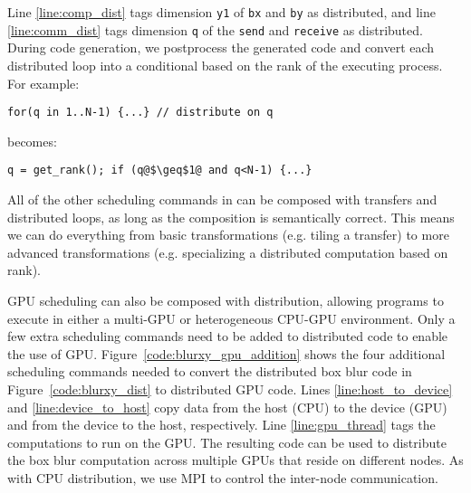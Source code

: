 Line \ref{line:comp_dist} tags dimension \lstinline{y1} of \lstinline{bx} and \lstinline{by} as distributed, and line \ref{line:comm_dist} tags dimension \lstinline{q} of the \lstinline{send} and \lstinline{receive} as distributed. During code generation, we postprocess the generated code and convert each distributed loop into a conditional based on the rank of the executing process. For example: 
\begin{lstlisting}[numbers=none]
for(q in 1..N-1) {...} // distribute on q
\end{lstlisting}
becomes:
\begin{lstlisting}[escapechar=@,numbers=none]
q = get_rank(); if (q@$\geq$1@ and q<N-1) {...}
\end{lstlisting}

All of the other scheduling commands in \framework{} can be composed with transfers and distributed loops, as long as the composition is semantically correct.  This means we can do everything from basic transformations (e.g. tiling a transfer) to more advanced transformations (e.g. specializing a distributed computation based on rank).

GPU scheduling can also be composed with distribution, allowing programs to execute in either a multi-GPU or heterogeneous CPU-GPU environment. Only a few extra scheduling commands need to be added to distributed \framework{} code to enable the use of GPU. Figure~\ref{code:blurxy_gpu_addition} shows the four additional scheduling commands needed to convert the distributed box blur code in Figure~\ref{code:blurxy_dist} to distributed GPU code. Lines \ref{line:host_to_device} and \ref{line:device_to_host} copy data from the host (CPU) to the device (GPU) and from the device to the host, respectively. Line \ref{line:gpu_thread} tags the computations to run on the GPU. The resulting code can be used to distribute the box blur computation across multiple GPUs that reside on different nodes. As with CPU distribution, we use MPI to control the inter-node communication.

